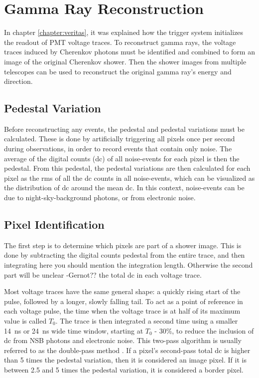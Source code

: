 \cleartooddpage[\thispagestyle{empty}]
\chapter{Gamma Ray Reconstruction}\label{ch:grrecon}

In chapter \ref{chapter:veritas}, it was explained how the trigger system initializes the readout of PMT voltage traces.
To reconstruct gamma rays, the voltage traces induced by Cherenkov photons must be identified and combined to form an image of the original Cherenkov shower.
Then the shower images from multiple telescopes can be used to reconstruct the original gamma ray's energy and direction.

\section{Pedestal Variation}
  Before reconstructing any events, the pedestal and pedestal variations must be calculated.
  These is done by artificially triggering all pixels once per second during observations, in order to record events that contain only noise.
  The average of the digital counts (dc) of all noise-events for each pixel is then the pedestal.
  From this pedestal, the pedestal variations are then calculated for each pixel as the rms of all the dc counts in all noise-events, which can be visualized as the distribution of dc around the mean dc.
  In this context, noise-events can be due to night-sky-background photons, or from electronic noise.

\section{Pixel Identification}
  The first step is to determine which pixels are part of a shower image.
  This is done by subtracting the digital counts pedestal from the entire trace, and then integrating {\color{red} here you should mention the integration length.  Otherwise the second part will be unclear -Gernot??} the total dc in each voltage trace.

  Most voltage traces have the same general shape: a quickly rising start of the pulse, followed by a longer, slowly falling tail.
  To act as a point of reference in each voltage pulse, the time when the voltage trace is at half of its maximum value is called $T_{0}$.
  The trace is then integrated a second time using a smaller \SI{14}{ns} or \SI{24}{ns} wide time window, starting at $T_0$ - 30\%, to reduce the inclusion of dc from NSB photons and electronic noise.
  This two-pass algorithm is usually referred to as the double-pass method \cite{doublepass}.
  If a pixel's second-pass total dc is higher than 5 times the pedestal variation, then it is considered an image pixel.
  If it is between 2.5 and 5 times the pedestal variation, it is considered a border pixel.

